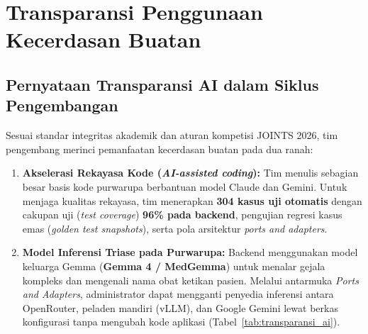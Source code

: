
\section{Transparansi Penggunaan Kecerdasan Buatan}

\subsection{Pernyataan Transparansi AI dalam Siklus Pengembangan}

Sesuai standar integritas akademik dan aturan kompetisi JOINTS 2026, tim pengembang merinci pemanfaatan kecerdasan buatan pada dua ranah:
\begin{enumerate}
    \item \textbf{Akselerasi Rekayasa Kode (\textit{AI-assisted coding}):} Tim menulis sebagian besar basis kode purwarupa berbantuan model Claude dan Gemini. Untuk menjaga kualitas rekayasa, tim menerapkan \textbf{304 kasus uji otomatis} dengan cakupan uji (\textit{test coverage}) \textbf{96\% pada backend}, pengujian regresi kasus emas (\textit{golden test snapshots}), serta pola arsitektur \textit{ports and adapters}.
    \item \textbf{Model Inferensi Triase pada Purwarupa:} Backend menggunakan model keluarga Gemma (\textbf{Gemma 4 / MedGemma}) untuk menalar gejala kompleks dan mengenali nama obat ketikan pasien. Melalui antarmuka \textit{Ports and Adapters}, administrator dapat mengganti penyedia inferensi antara OpenRouter, peladen mandiri (vLLM), dan Google Gemini lewat berkas konfigurasi tanpa mengubah kode aplikasi (Tabel~\ref{tab:transparansi_ai}).
\end{enumerate}

